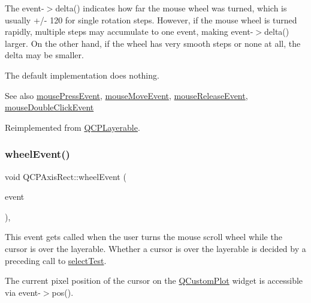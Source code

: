 The {\ttfamily event-\/$>$delta()} indicates how far the mouse wheel was turned, which is usually +/-\/ 120 for single rotation steps. However, if the mouse wheel is turned rapidly, multiple steps may accumulate to one event, making {\ttfamily event-\/$>$delta()} larger. On the other hand, if the wheel has very smooth steps or none at all, the delta may be smaller.

The default implementation does nothing.

\begin{DoxySeeAlso}{See also}
\hyperlink{class_q_c_p_axis_rect_aa9a7c807eaa4666870ac94aa6abc4dde}{mouse\+Press\+Event}, \hyperlink{class_q_c_p_axis_rect_a9cd27ad8c5cfb49aefd9dbb30def4beb}{mouse\+Move\+Event}, \hyperlink{class_q_c_p_axis_rect_a6c89b988d3a0b93c0878f0ebdb5037f4}{mouse\+Release\+Event}, \hyperlink{class_q_c_p_layerable_a4171e2e823aca242dd0279f00ed2de81}{mouse\+Double\+Click\+Event} 
\end{DoxySeeAlso}


Reimplemented from \hyperlink{class_q_c_p_layerable_a47dfd7b8fd99c08ca54e09c362b6f022}{Q\+C\+P\+Layerable}.

\mbox{\label{class_q_c_p_axis_rect_a93eeaa0c127d6d6fe8171b2455080262}} 
\subsubsection{\texorpdfstring{wheel\+Event()}{wheelEvent()}\hspace{0.1cm}{\footnotesize\ttfamily [2/2]}}
{\footnotesize\ttfamily void Q\+C\+P\+Axis\+Rect\+::wheel\+Event (\begin{DoxyParamCaption}\item[{Q\+Wheel\+Event $\ast$}]{event }\end{DoxyParamCaption})\hspace{0.3cm}{\ttfamily [protected]}, {\ttfamily [virtual]}}

This event gets called when the user turns the mouse scroll wheel while the cursor is over the layerable. Whether a cursor is over the layerable is decided by a preceding call to \hyperlink{class_q_c_p_layout_element_ae97f483cccedadbf18ea4525ef240ee4}{select\+Test}.

The current pixel position of the cursor on the \hyperlink{class_q_custom_plot}{Q\+Custom\+Plot} widget is accessible via {\ttfamily event-\/$>$pos()}.

